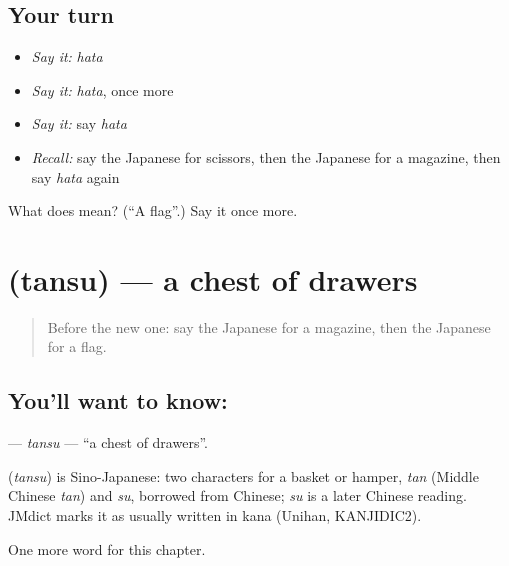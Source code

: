 \subsection*{Your turn}
\begin{itemize}
\raggedright
  \item \emph{Say it:} \emph{hata}
  \item \emph{Say it:} \emph{hata}, once more
  \item \emph{Say it:} say \emph{hata}
  \item \emph{Recall:} say the Japanese for scissors, then the Japanese for a magazine, then say \emph{hata} again
\end{itemize}

\begin{tcolorbox}[breakable,colback=teal!4,colframe=teal!35!black,title={Before you move on}]
What does  mean? (\textquotedblleft{}A flag\textquotedblright{}.) Say it once more.
\end{tcolorbox}
\section[\texorpdfstring{\ja{たんす} (tansu)}{たんす (tansu)}]{ (tansu) — a chest of drawers}

\label{lesson:JA-C101-tansu}



\begin{quote}
Before the new one: say the Japanese for a magazine, then the Japanese for a flag.
\end{quote}

\subsection*{You'll want to know: }
\textbf{} — \emph{tansu} — \textquotedblleft{}a chest of drawers\textquotedblright{}.

\begin{cousinweb}
\textbf{} (\emph{tansu}) is Sino-Japanese: two characters for a basket or hamper, \emph{tan} (Middle Chinese \emph{tan}) and \emph{su}, borrowed from Chinese; \emph{su} is a later Chinese reading. JMdict marks it as usually written in kana (Unihan, KANJIDIC2).
\end{cousinweb}

\begin{grammarlens}[title={What you've built}]
One more word for this chapter.
\end{grammarlens}

